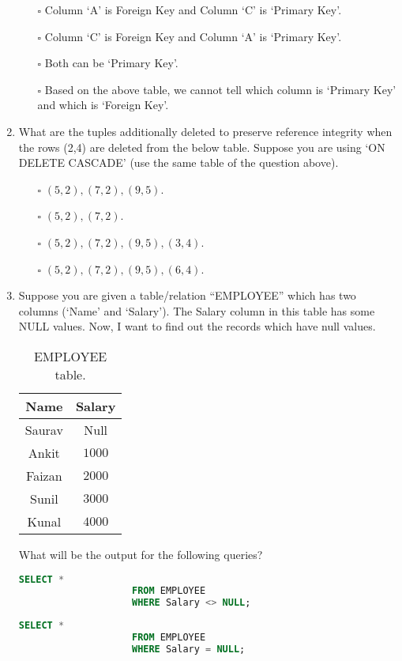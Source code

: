 \documentclass[10pt]{article}
\newcommand{\lightrule}{%
	\arrayrulecolor{black!30}%
	\midrule[\lightrulewidth]%
	\arrayrulecolor{black}}
\begin{document}
\begin{enumerate}
				\begin{enumerate}
					\item[$\square$] Column ‘A’ is Foreign Key and Column ‘C’ is ‘Primary Key’.
					\item[$\square$] Column ‘C’ is Foreign Key and Column ‘A’ is ‘Primary Key’.
					\item[$\square$] Both can be ‘Primary Key’.
					\item[$\square$] Based on the above table, we cannot tell which column is ‘Primary Key’ and which is ‘Foreign Key’.
				\end{enumerate}

			\item What are the tuples additionally deleted to preserve reference integrity when the rows (2,4) are deleted from the below table. Suppose you are using ‘ON DELETE CASCADE’ (use the same table of the question above).
				\begin{enumerate}
					\item[$\square$] $(5,2), (7,2), (9,5)$.
					\item[$\square$] $(5,2), (7,2)$.
					\item[$\square$] $(5,2), (7,2), (9,5), (3,4)$.
					\item[$\square$] $(5,2), (7,2),(9,5), (6,4)$.
				\end{enumerate}
			
			\newpage

			\item Suppose you are given a table/relation “EMPLOYEE” which has two columns (‘Name’ and ‘Salary’). The Salary column in this table has some NULL values. Now, I want to find out the records which have null values.
				\begin{table}[H]
					\centering
					\begin{tabular}{@{} *{2}{c} @{}}
						\toprule
							\textbf{Name} & \textbf{Salary} \\
						\midrule
							Saurav & Null \\ 
						\lightrule
							Ankit & $1000$ \\  
						\lightrule
							Faizan & $2000$ \\
						\lightrule 
							Sunil & $3000$ \\ 
						\lightrule 
							Kunal & $4000$ \\ 
						\bottomrule
					\end{tabular}
					\caption{EMPLOYEE table.}
				\end{table}
				What will be the output for the following queries?
				\begin{lstlisting}[language=SQL,firstline=1, lastline=3] 
					SELECT * 
					FROM EMPLOYEE 
					WHERE Salary <> NULL;
				\end{lstlisting}
				\begin{lstlisting}[language=SQL,firstline=1, lastline=3] 
					SELECT * 
					FROM EMPLOYEE 
					WHERE Salary = NULL;
				\end{lstlisting}


\end{enumerate}
\end{document}
